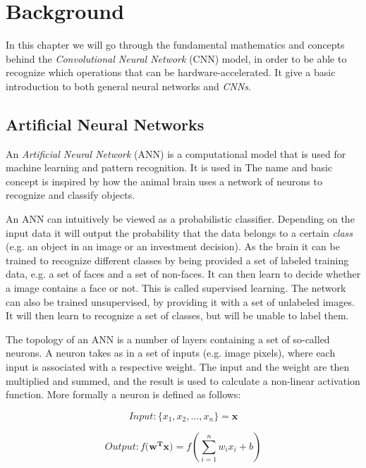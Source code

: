 \chapter{Background}

In this chapter we will go through the fundamental mathematics and concepts behind the \textit{Convolutional Neural Network} (CNN) model, in order to be able to recognize which operations that can be hardware-accelerated. It give a basic introduction to both general neural networks and \textit{CNNs}.  

\section{Artificial Neural Networks}

An \textit{Artificial Neural Network} (ANN) is a computational model that is used for machine learning and pattern recognition. It is used in The name and basic concept is inspired by how the animal brain uses a network of neurons to recognize and classify objects. 

An ANN can intuitively be viewed as a probabilistic classifier. Depending on the input data it will output the probability that the data belongs to a certain \textit{class} (e.g. an object in an image or an investment decision). As the brain it can be trained to recognize different classes by being provided a set of labeled training data, e.g. a set of faces and a set of non-faces. It can then learn to decide whether a image contains a face or not. This is called supervised learning. The network can also be trained unsupervised, by providing it with a set of unlabeled images. It will then learn to recognize a set of classes, but will be unable to label them.  

The topology of an ANN is a number of layers containing a set of so-called neurons. A neuron takes as in a set of inputs (e.g. image pixels), where each input is associated with a respective weight. The input and the weight are then multiplied and summed, and the result is used to calculate a non-linear activation function. More formally a neuron is defined as follows: 

\begin{equation*}
Input: \{x_1, x_2,\dots, x_n\} = \mathbf{x} 
\end{equation*}

\begin{equation*}
Output: f(\mathbf{w^{T}x)} = f(\sum_{i=1}^{n}w_i x_i + b)
\end{equation*}

